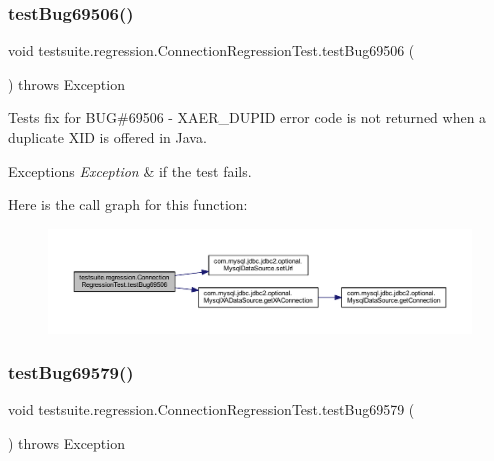 \subsubsection{\texorpdfstring{test\+Bug69506()}{testBug69506()}}
{\footnotesize\ttfamily void testsuite.\+regression.\+Connection\+Regression\+Test.\+test\+Bug69506 (\begin{DoxyParamCaption}{ }\end{DoxyParamCaption}) throws Exception}

Tests fix for B\+UG\#69506 -\/ X\+A\+E\+R\+\_\+\+D\+U\+P\+ID error code is not returned when a duplicate X\+ID is offered in Java.


\begin{DoxyExceptions}{Exceptions}
{\em Exception} & if the test fails. \\
\hline
\end{DoxyExceptions}
Here is the call graph for this function\+:
\nopagebreak
\begin{figure}[H]
\begin{center}
\leavevmode
\includegraphics[width=350pt]{classtestsuite_1_1regression_1_1_connection_regression_test_ac8bd9a129a96fb8c9d9c220369e1a5b2_cgraph}
\end{center}
\end{figure}
\mbox{\label{classtestsuite_1_1regression_1_1_connection_regression_test_a09e5aef6835aa4e8cf07bde4c3d06a28}} 
\subsubsection{\texorpdfstring{test\+Bug69579()}{testBug69579()}}
{\footnotesize\ttfamily void testsuite.\+regression.\+Connection\+Regression\+Test.\+test\+Bug69579 (\begin{DoxyParamCaption}{ }\end{DoxyParamCaption}) throws Exception}

